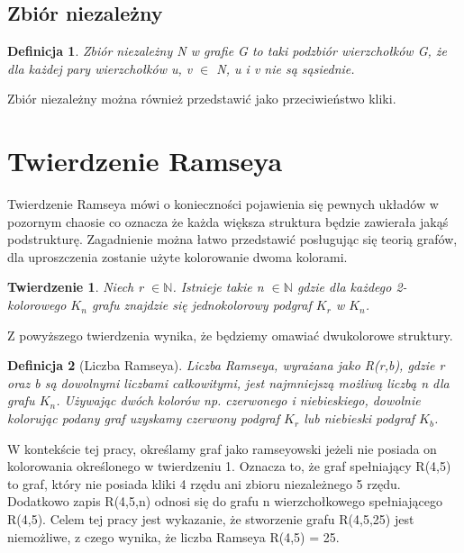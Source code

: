 \documentclass[11pt]{article}
\newtheorem{theorem}{Twierdzenie}
\newtheorem{definition}{Definicja}[section]
\begin{document}
  \subsection{Zbiór niezależny}
  \begin{definition}
    Zbiór niezależny N w grafie G to taki podzbiór wierzchołków G, że dla każdej pary wierzchołków u, v $\in$ N, u i v nie są sąsiednie. 
  \end{definition}
  
    Zbiór niezależny można również przedstawić jako przeciwieństwo kliki.
   

\section{Twierdzenie Ramseya}

Twierdzenie Ramseya mówi o konieczności pojawienia się pewnych układów w pozornym chaosie co oznacza że każda większa struktura będzie zawierała jakąś podstrukturę. Zagadnienie można łatwo przedstawić posługując się teorią grafów, dla uproszczenia zostanie użyte kolorowanie dwoma kolorami.

\begin{theorem}
Niech r $\in \mathbb{N}$. Istnieje takie n $\in \mathbb{N}$  gdzie dla każdego 2-kolorowego $\mathit{K}_{n}$ grafu znajdzie się jednokolorowy podgraf $\mathit{K}_{r}$ w $\mathit{K}_{n}$.  \cite{theory} 
\end{theorem}

Z powyższego twierdzenia wynika, że będziemy omawiać dwukolorowe struktury. 

\begin{definition}[Liczba Ramseya]
Liczba Ramseya, wyrażana jako R(r,b), gdzie r oraz b są dowolnymi liczbami całkowitymi, jest najmniejszą możliwą liczbą n dla grafu $\mathit{K}_{n}$. Używając dwóch kolorów np. czerwonego i niebieskiego, dowolnie kolorując podany graf uzyskamy czerwony podgraf $\mathit{K}_{r}$ lub niebieski podgraf $\mathit{K}_{b}$.  \cite{theory} 
\end{definition}

W kontekście tej pracy, określamy graf jako ramseyowski jeżeli nie posiada on kolorowania określonego w twierdzeniu 1. Oznacza to, że graf spełniający R(4,5) to graf, który nie posiada kliki 4 rzędu ani zbioru niezależnego 5 rzędu. Dodatkowo zapis R(4,5,n) odnosi się do grafu n wierzchołkowego spełniającego R(4,5). 
Celem tej pracy jest wykazanie, że stworzenie grafu R(4,5,25) jest niemożliwe, z czego wynika, że liczba Ramseya R(4,5) = 25.
\end{document}
